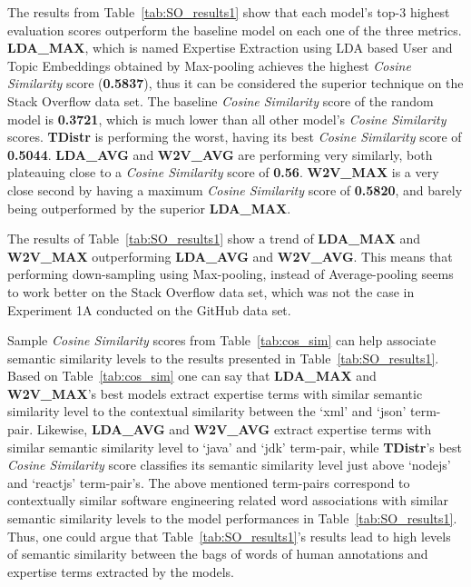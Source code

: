             The results from Table~\ref{tab:SO_results1} show that each model's top-$3$ highest evaluation scores outperform the baseline model on each one of the three metrics. \textbf{LDA\_MAX}, which is named Expertise Extraction using LDA based User and Topic Embeddings obtained by Max-pooling achieves the highest \emph{Cosine Similarity} score (\textbf{0.5837}), thus it can be considered the superior technique on the Stack Overflow data set. The baseline \emph{Cosine Similarity} score of the random model is \textbf{0.3721}, which is much lower than all other model's \emph{Cosine Similarity} scores. \textbf{TDistr} is performing the worst, having its best \emph{Cosine Similarity} score of \textbf{0.5044}. \textbf{LDA\_AVG} and \textbf{W2V\_AVG} are performing very similarly, both plateauing close to a \emph{Cosine Similarity} score of \textbf{0.56}. \textbf{W2V\_MAX} is a very close second by having a maximum \emph{Cosine Similarity} score of \textbf{0.5820}, and barely being outperformed by the superior \textbf{LDA\_MAX}.
            
            The results of Table~\ref{tab:SO_results1} show a trend of \textbf{LDA\_MAX} and \textbf{W2V\_MAX} outperforming \textbf{LDA\_AVG} and \textbf{W2V\_AVG}. This means that performing down-sampling using Max-pooling, instead of Average-pooling seems to work better on the Stack Overflow data set, which was not the case in Experiment 1A conducted on the GitHub data set.
            
            Sample \emph{Cosine Similarity} scores from Table~\ref{tab:cos_sim} can help associate semantic similarity levels to the results presented in Table~\ref{tab:SO_results1}. Based on Table~\ref{tab:cos_sim} one can say that  \textbf{LDA\_MAX} and \textbf{W2V\_MAX}'s best models extract expertise terms with similar semantic similarity level to the contextual similarity between the `xml' and `json' term-pair. Likewise, \textbf{LDA\_AVG} and \textbf{W2V\_AVG} extract expertise terms with similar semantic similarity level to `java' and `jdk' term-pair, while \textbf{TDistr}'s best \emph{Cosine Similarity} score classifies its semantic similarity level just above `nodejs' and `reactjs' term-pair's. The above mentioned term-pairs correspond to contextually similar software engineering related word associations with similar semantic similarity levels to the model performances in Table~\ref{tab:SO_results1}. Thus, one could argue that Table~\ref{tab:SO_results1}'s results lead to high levels of semantic similarity between the bags of words of human annotations and expertise terms extracted by the models.
            
